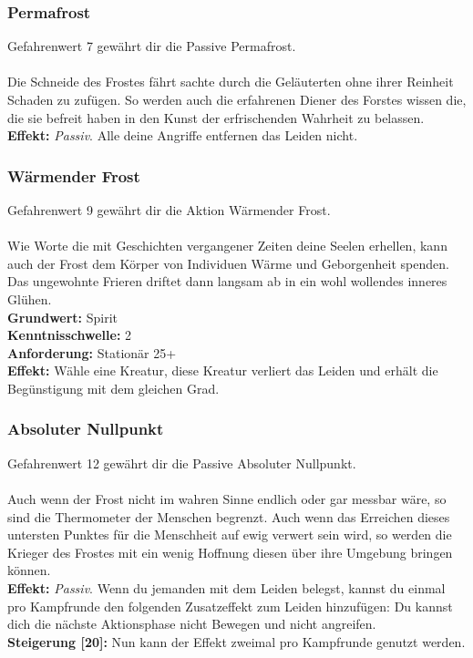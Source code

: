 \subsubsection*{ Permafrost} \label{sk:permafrost}
Gefahrenwert 7 gewährt dir die Passive Permafrost.\\
\\
Die Schneide des Frostes fährt sachte durch die Geläuterten ohne ihrer Reinheit Schaden zu zufügen. So werden auch die erfahrenen Diener des Forstes wissen die, die sie befreit haben in den Kunst der erfrischenden Wahrheit zu belassen. \\
\textbf{Effekt:} \textit{Passiv}. Alle deine Angriffe entfernen das Leiden  nicht.


\subsubsection*{ Wärmender Frost} \label{sk:waermender_frost}
Gefahrenwert 9 gewährt dir die Aktion Wärmender Frost.\\
\\
Wie Worte die mit Geschichten vergangener Zeiten deine Seelen erhellen, kann auch der Frost dem Körper von Individuen Wärme und Geborgenheit spenden. Das ungewohnte Frieren driftet dann langsam ab in ein wohl wollendes inneres Glühen. \\
\textbf{Grundwert:} Spirit \\
\textbf{Kenntnisschwelle:} 2 \\
\textbf{Anforderung:} Stationär 25+ \\
\textbf{Effekt:} Wähle eine Kreatur, diese Kreatur verliert das Leiden  und erhält die Begünstigung  mit dem gleichen Grad.

\subsubsection*{ Absoluter Nullpunkt} \label{sk:absoluter_nullpunkt}
Gefahrenwert 12 gewährt dir die Passive Absoluter Nullpunkt.\\
\\
Auch wenn der Frost nicht im wahren Sinne endlich oder gar messbar wäre, so sind die Thermometer der Menschen begrenzt. Auch wenn das Erreichen dieses untersten Punktes für die Menschheit auf ewig verwert sein wird, so werden die Krieger des Frostes mit ein wenig Hoffnung diesen über ihre Umgebung bringen können. \\
\textbf{Effekt:} \textit{Passiv}. Wenn du jemanden mit dem Leiden  belegst, kannst du einmal pro Kampfrunde den folgenden Zusatzeffekt zum Leiden hinzufügen: Du kannst dich die nächste Aktionsphase nicht Bewegen und nicht angreifen.\\
\textbf{Steigerung [20]:} Nun kann der Effekt zweimal pro Kampfrunde genutzt werden.

